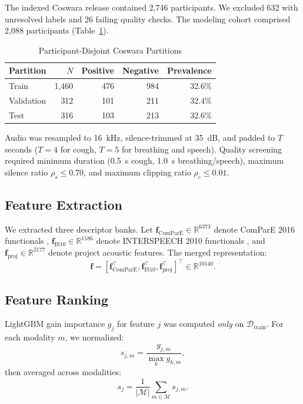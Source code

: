 \documentclass[conference]{IEEEtran}
\begin{document}
The indexed Coswara release contained 2,746 participants. We excluded 632 with unresolved labels and 26 failing quality checks. The modeling cohort comprised 2,088 participants (Table~\ref{tab:cohort}).

\begin{table}[!b]
\caption{Participant-Disjoint Coswara Partitions}
\label{tab:cohort}
\centering
\footnotesize
\begin{tabular}{lrrrr}
\toprule
Partition & $N$ & Positive & Negative & Prevalence \\
\midrule
Train      & 1,460 & 476 & 984 & 32.6\% \\
Validation &   312 & 101 & 211 & 32.4\% \\
Test       &   316 & 103 & 213 & 32.6\% \\
\bottomrule
\end{tabular}
\end{table}

Audio was resampled to 16~kHz, silence-trimmed at 35~dB, and padded to $T$ seconds ($T=4$ for cough, $T=5$ for breathing and speech). Quality screening required minimum duration (0.5~s cough, 1.0~s breathing/speech), maximum silence ratio $\rho_s \leq 0.70$, and maximum clipping ratio $\rho_c \leq 0.01$.

\subsection{Feature Extraction}

We extracted three descriptor banks. Let $\mathbf{f}_{\text{ComParE}} \in \mathbb{R}^{6373}$ denote ComParE 2016 functionals \cite{schuller2016compare}, $\mathbf{f}_{\text{IS10}} \in \mathbb{R}^{1586}$ denote INTERSPEECH 2010 functionals \cite{schuller2010is10}, and $\mathbf{f}_{\text{proj}} \in \mathbb{R}^{2177}$ denote project acoustic features. The merged representation:
\begin{equation}
\mathbf{f} = [\mathbf{f}_{\text{ComParE}}^\top, \mathbf{f}_{\text{IS10}}^\top, \mathbf{f}_{\text{proj}}^\top]^\top \in \mathbb{R}^{10140}.
\end{equation}

\subsection{Feature Ranking}

LightGBM gain importance $g_j$ for feature $j$ was computed \emph{only} on $\mathcal{D}_{\text{train}}$. For each modality $m$, we normalized:
\begin{equation}
s_{j,m} = \frac{g_{j,m}}{\max_k g_{k,m}},
\end{equation}
then averaged across modalities:
\begin{equation}
s_j = \frac{1}{|\mathcal{M}|} \sum_{m \in \mathcal{M}} s_{j,m}.
\end{equation}
\end{document}

